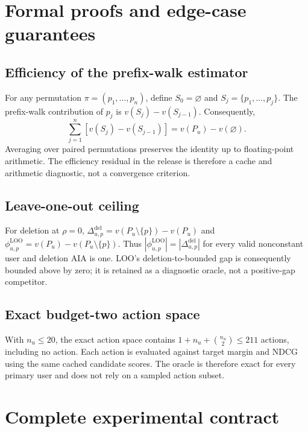 \documentclass[pdflatex,sn-basic,Numbered]{sn-jnl}
\theoremstyle{thmstyleone}
\theoremstyle{thmstyletwo}
\theoremstyle{thmstylethree}
\begin{document}
\begin{appendices}
\section{Formal proofs and edge-case guarantees}\label{app:proofs}

\subsection{Efficiency of the prefix-walk estimator}
For any permutation $\pi=(p_1,\ldots,p_n)$, define $S_0=\varnothing$ and $S_j=\{p_1,\ldots,p_j\}$. The prefix-walk contribution of $p_j$ is $v(S_j)-v(S_{j-1})$. Consequently,
\begin{equation}
\sum_{j=1}^{n}\left[v(S_j)-v(S_{j-1})\right]=v(P_u)-v(\varnothing).
\end{equation}
Averaging over paired permutations preserves the identity up to floating-point arithmetic. The efficiency residual in the release is therefore a cache and arithmetic diagnostic, not a convergence criterion.

\subsection{Leave-one-out ceiling}
For deletion at $\rho=0$, $\Delta^{\mathrm{del}}_{u,p}=v(P_u\setminus\{p\})-v(P_u)$ and $\phi^{\mathrm{LOO}}_{u,p}=v(P_u)-v(P_u\setminus\{p\})$. Thus $|\phi^{\mathrm{LOO}}_{u,p}|=|\Delta^{\mathrm{del}}_{u,p}|$ for every valid nonconstant user and deletion AIA is one. LOO's deletion-to-bounded gap is consequently bounded above by zero; it is retained as a diagnostic oracle, not a positive-gap competitor.

\subsection{Exact budget-two action space}
With $n_u\le20$, the exact action space contains $1+n_u+\binom{n_u}{2}\le211$ actions, including no action. Each action is evaluated against target margin and NDCG using the same cached candidate scores. The oracle is therefore exact for every primary user and does not rely on a sampled action subset.

\section{Complete experimental contract}\label{app:contract}


\end{appendices}
\end{document}
